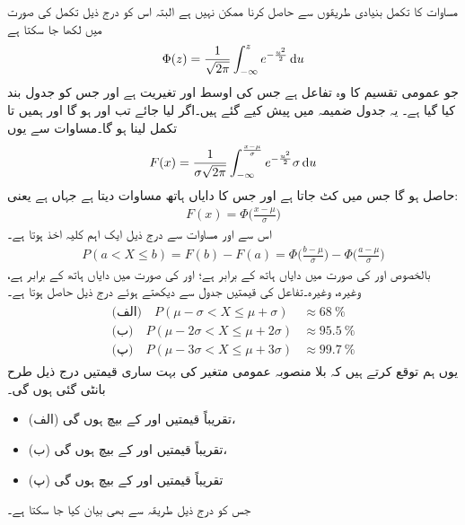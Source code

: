 مساوات  کا تکمل بنیادی طریقوں سے حاصل کرنا ممکن نہیں ہے البتہ اس کو درج ذیل تکمل کی صورت میں لکھا جا سکتا ہے
\begin{align}\label{مساوات_شماریات_عمومی_تقسیم_ت}
\Phi(z)=\frac{1}{\sqrt{2\pi}}\int_{-\infty}^{z}e^{-\frac{u^2}{2}}\dif u
\end{align}
جو عمومی تقسیم کا وہ تفاعل ہے جس کی اوسط  اور تغیریت  ہے اور جس کو جدول بند کیا گیا ہے۔ یہ جدول ضمیمہ  میں پیش کیے گئے ہیں۔اگر  لیا جائے تب  اور  ہو گا اور ہمیں  تا  تکمل لینا ہو گا۔مساوات  سے یوں
\begin{align*}
F(x)=\frac{1}{\sigma\sqrt{2\pi}}\int_{-\infty}^{\frac{x-\mu}{\sigma}}e^{-\frac{u^2}{2}}\sigma \dif u
\end{align*}
حاصل ہو گا جس میں  کٹ جاتا ہے اور جس کا دایاں ہاتھ مساوات  دیتا ہے جہاں   ہے یعنی:
\begin{align}\label{مساوات_شماریات_عمومی_تقسیم_ٹ}
F(x)=\Phi\big(\frac{x-\mu}{\sigma}\big)
\end{align}
اس سے اور مساوات  سے درج ذیل ایک اہم کلیہ  اخذ ہوتا ہے۔
\begin{align}\label{مساوات_شماریات_عمومی_تقسیم_ث}
P(a<X\le b)=F(b)-F(a)=\Phi\big(\frac{b-\mu}{\sigma}\big)-\Phi\big(\frac{a-\mu}{\sigma}\big)
\end{align}
بالخصوص  اور  کی صورت میں دایاں ہاتھ  کے برابر ہے؛  
 اور  کی صورت میں دایاں ہاتھ  کے برابر ہے، وغیرہ، وغیرہ۔تفاعل  کی قیمتیں جدول سے دیکھتے ہوئے درج ذیل حاصل ہوتا ہے۔
\begin{gather}
\begin{aligned}\label{مساوات_شماریات_عمومی_تقسیم_ج}
\text{(الف)}\quad P(\mu-\sigma<X\le \mu+\sigma)&\approx \SI{68}{\percent}\\
\text{(ب)}\quad P(\mu-2\sigma<X\le \mu+2\sigma)&\approx \SI{95.5}{\percent}\\
\text{(پ)}\quad P(\mu-3\sigma<X\le \mu+3\sigma)&\approx \SI{99.7}{\percent}
\end{aligned}
\end{gather}
یوں ہم توقع کرتے ہیں کہ بلا منصوبہ عمومی متغیر  کی بہت ساری قیمتیں درج ذیل طرح بانٹی گئی ہوں گی۔
\begin{itemize}
\item{(الف)}
تقریباً  قیمتیں  اور  کے بیچ ہوں گی،
\item{(ب)}
تقریباً  قیمتیں  اور  کے بیچ ہوں گی،
\item{(پ)}
تقریباً  قیمتیں  اور  کے بیچ ہوں گی
\end{itemize}
جس کو درج ذیل طریقہ سے بھی بیان کیا جا سکتا ہے۔

